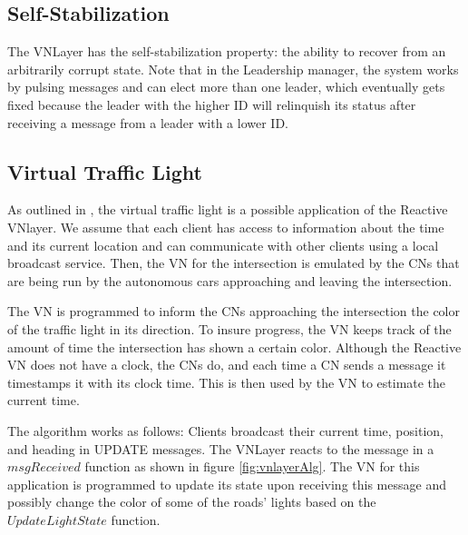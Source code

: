 \documentclass[12pt]{article}
\begin{document}
\subsection{Self-Stabilization}
The VNLayer has the self-stabilization property:  the ability to recover from an arbitrarily corrupt state\cite{ssvnlayer}.  Note that in the Leadership manager, the system works by pulsing messages and can elect more than one leader, which eventually gets fixed because the leader with the higher ID will relinquish its status after receiving a message from a leader with a lower ID. 
\subsection{Virtual Traffic Light}
As outlined in \cite{vnlayer}, the virtual traffic light is a possible application of the Reactive VNlayer.  We assume that each client has access to information about the time and its current location and can communicate with other clients using a local broadcast service. Then, the VN for the intersection is emulated by the CNs that are being run by the autonomous cars approaching and leaving the intersection. 

The VN is programmed to inform the CNs approaching the intersection the color of the traffic light in its direction.  To insure progress, the VN keeps track of the amount of time the intersection has shown a certain color.  Although the Reactive VN does not have a clock, the CNs do, and each time a CN sends a message it timestamps it with its clock time.  This is then used by the VN to estimate the current time.   

The algorithm works as follows:  Clients broadcast their current time, position, and heading in UPDATE messages.  The VNLayer reacts to the message in a $msgReceived$ function as shown in figure \ref{fig:vnlayerAlg}.  The VN for this application is programmed to update its state upon receiving this message and possibly change the color of some of the roads' lights based on the $UpdateLightState$ function. 
\end{document}
